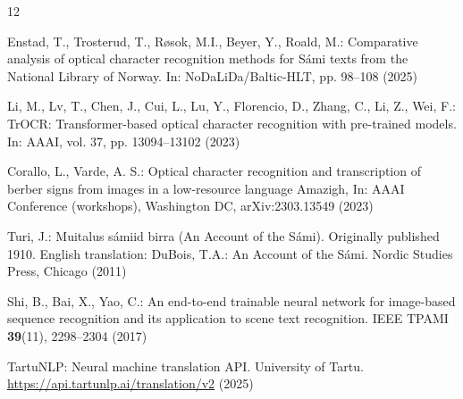 \documentclass[runningheads]{llncs}
\begin{document}
\begin{thebibliography}{12}

\footnotesize


Enstad, T., Trosterud, T., R{\o}sok, M.I., Beyer, Y., Roald, M.:
Comparative analysis of optical character recognition methods for
{S\'{a}mi} texts from the National Library of Norway.
In: NoDaLiDa/Baltic-HLT, pp. 98--108 (2025)

Li, M., Lv, T., Chen, J., Cui, L., Lu, Y., Florencio, D., Zhang, C., Li, Z., Wei, F.:
TrOCR: Transformer-based optical character recognition with pre-trained models.
In: AAAI, vol. 37, pp. 13094--13102 (2023)



  Corallo, L., Varde, A. S.:
  Optical character recognition and transcription of berber signs from images in a low-resource language Amazigh,
  In: AAAI Conference (workshops), Washington DC, arXiv:2303.13549 (2023) 

 Turi, J.: Muitalus s\'{a}miid birra (An Account of the S\'{a}mi).
 Originally published 1910. English translation: DuBois, T.A.: An Account of the S\'{a}mi.
 Nordic Studies Press, Chicago (2011)


Shi, B., Bai, X., Yao, C.: An end-to-end trainable neural network for
image-based sequence recognition and its application to scene text recognition.
IEEE TPAMI \textbf{39}(11), 2298--2304 (2017)

 
TartuNLP: Neural machine translation API. University of Tartu.
\url{https://api.tartunlp.ai/translation/v2} (2025)








\end{thebibliography}
\end{document}
